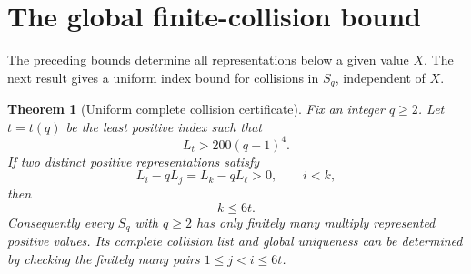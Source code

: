 \documentclass[11pt]{article}
\newtheorem{theorem}{Theorem}[section]
\begin{document}
\section{The global finite-collision bound}
The preceding bounds determine all representations below a given
value $X$. The next result gives a uniform index bound for
collisions in $S_q$, independent of $X$.
\begin{theorem}[Uniform complete collision certificate]
\label{thm:global}
Fix an integer $q\ge2$. Let $t=t(q)$ be the least
positive index such that
\begin{equation}\label{eq:t-bound}
L_t>200(q+1)^4.
\end{equation}
If two distinct positive representations satisfy
\[
L_i-qL_j=L_k-qL_\ell>0,\qquad i<k,
\]
then
\begin{equation}\label{eq:collision-cutoff}
\boxed{k\le6t.}
\end{equation}
Consequently every $S_q$ with $q\ge2$ has
only finitely many multiply represented positive values.
Its complete collision list and global uniqueness
can be determined by checking the finitely many
pairs $1\le j<i\le6t$.
\end{theorem}
\end{document}
